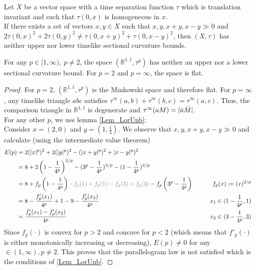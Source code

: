 \documentclass[10pt,a4paper]{amsart}
\newcommand{\R}{\mathbb{R}} %
\newcommand{\mDef}{\coloneqq }
\begin{document}
\begin{lemma}
\label{Lem_LorUnb}
Let $X$ be a vector space with a time separation function $\tau$ which is translation invariant and such that $\tau(0,x)$ is homogeneous in $x$.\\
If there exists a set of vectors $x,y\in X$ such that $x,y,x+y,x-y\gg 0$ and \\
$2 \tau(0,x)^2 + 2 \tau(0,y)^2 \neq \tau(0,x+y)^2 + \tau(0,x-y)^2$, then $(X,\tau)$ has neither upper nor lower timelike sectional curvature bounds.
\end{lemma}

\begin{lemma}
For any $p \in [1,\infty),\ p\neq 2$, the space $(\R^{1,1},\tau^p)$ has neither an upper nor a lower sectional curvature bound. For $p=2$ and $p=\infty$, the space is flat.
\end{lemma}

\begin{proof}
For $p=2$, $(\R^{1,1},\tau^p)$ is the Minkowski space and therefore flat.
For $p=\infty$, any timelike triangle $abc$ satisfies $\tau^\infty(a,b) + \tau^\infty(b,c) = \tau^\infty(a,c)$. Thus, the comparison triangle in $\R^{1,1}$ is degenerate and $\tau^\infty(aM) = |\Bar{a}\Bar{M}|$.\\
   For any other $p$, we use lemma \ref{Lem_LorUnb}:\\
   Consider $x=(2,0)$ and $y = (1,\frac{1}{4})$.
   We observe that $x,y,x+y,x-y\gg0$ and calculate (using the intermediate value theorem) 
   \begin{align*}
      E(p) &= 2 (|x|^p)^2 + 2 (|y|^p)^2 -  (|x+y|^p)^2 + |x-y|^p)^2\\
      &= 8 + 2 \left(1 - \frac{1}{4^p}\right)^{2/p} -  (3^p - \frac{1}{4^p})^{2/p} -  (1 - \frac{1}{4^p})^{2/p}\\
       &= 8 + f_p\left(1 - \frac{1}{4^p}\right) \textcolor{gray}{-f_p(1) + f_p(1) -f_p(3) + f_p(3)} -  f_p\left(3^p - \frac{1}{4^p}\right)   &\null \qquad f_p(x)\mDef(x)^{2/p} \\
      &= 8 - \frac{f_p'(x_1)}{4^p} + 1 - 9 - \frac{f_p'(x_2)}{4^p}  &\null \qquad x_1\in (1-\frac{1}{4^p},1)\\
      &= \frac{f_p'(x_1) - f_p'(x_2)}{4^p} &\null \qquad x_2\in (3-\frac{1}{4^p},3)
   \end{align*}
   Since $f_p(\cdot)$ is convex for $p>2$ and concave for $p<2$ (which means that $f'_p(\cdot)$ is either monotonically increasing or decreasing), $E(p)\neq0$ for any $\in (1,\infty), p\neq 2$. This proves that the parallelogram law is not satisfied which is the conditions of \ref{Lem_LorUnb}.
\end{proof}
\end{document}
